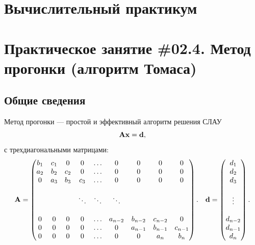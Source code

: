 \documentclass[12pt]{article}
\begin{document}
    \begin{flushright}
    \end{flushright}
    \begin{flushright}
    \end{flushright}
    \section*{Вычислительный практикум}
    \section*{Практическое занятие \#02.4. Метод прогонки (алгоритм Томаса)}

    \subsection*{Общие сведения}

    Метод прогонки --- простой и эффективный алгоритм решения СЛАУ
    \begin{equation}
        \bold{A}\bold{x}=\bold{d},\label{f1}
    \end{equation}
    с трехдиагональными матрицами:
    \begin{equation}
        \bold{A}=
        \begin{pmatrix}
        b_{1}&c_{1}&0&0&\ldots&0&0&0&0\\
        a_{2}&b_{2}&c_{2}&0&\ldots&0&0&0&0\\
        0&a_{3}&b_{3}&c_{3}&\ldots &0&0&0&0 \\
        &\\
        &&&\ddots&\ddots&\ddots&\\
        &\\
        0&0&0&0&\ldots & a_{n-2} &b_{n-2} & c_{n-2} & 0\\
        0&0&0&0&\ldots & 0 & a_{n-1} & b_{n-1} & c_{n-1}\\
        0&0&0&0&\ldots & 0 & 0 & a_{n}&b_{n}
        \end{pmatrix}.\quad
        \bold{d}=
        \begin{pmatrix}
            d_1 \\
            d_2 \\
            d_3 \\
            \\
            \vdots \\
            \\
            d_{n-2} \\
            d_{n-1} \\
            d_{n}
        \end{pmatrix}.
    \end{equation}
\end{document}
